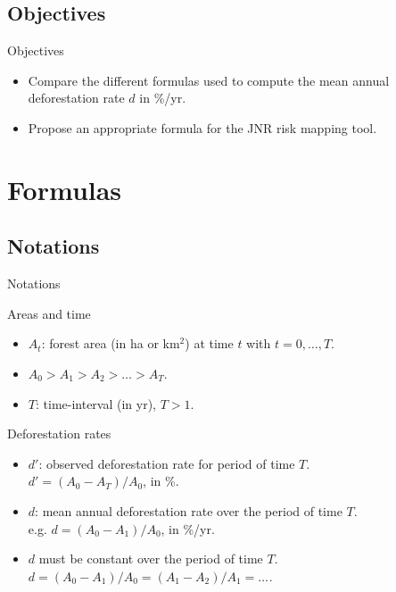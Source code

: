 \documentclass[10pt,table,dvipsnames,compress]{beamer}
\begin{document}
\subsection{Objectives}
\label{sec:orgccff547}

\begin{frame}[label={sec:orgce403f6}]{Objectives}
\begin{itemize}
\item Compare the different formulas used to compute the \alert{\alert{mean annual deforestation rate}} \(d\) in \%/yr.
\item Propose an appropriate formula for the JNR risk mapping tool.
\end{itemize}
\end{frame}

\section{Formulas}
\label{sec:org18477ee}

\subsection{Notations}
\label{sec:org9d871dd}

\begin{frame}[label={sec:org7f3b821}]{Notations}
\begin{block}{Areas and time}
\begin{itemize}
\item \(A_t\): forest area (in ha or km\(^2\)) at time \(t\) with \(t=0,\ldots,T\).
\item \(A_0 > A_1 > A_2 > \ldots > A_T\).
\item \(T\): time-interval (in yr), \(T > 1\).
\end{itemize}
\end{block}

\begin{block}{Deforestation \alert{\alert{rates}}}
\begin{itemize}
\item \(d'\): observed deforestation rate for period of time \(T\). \\
\(d' = (A_0-A_T)/A_0\), in \%.
\item \(d\): \alert{\alert{mean annual deforestation rate}} over the period of time \(T\). \\
e.g. \(d=(A_0-A_1)/A_0\), in \%/yr.
\item \(d\) must be constant over the period of time \(T\). \\
\(d=(A_0-A_1)/A_0=(A_1-A_2)/A_1=\ldots_{}\).
\end{itemize}
\end{block}
\end{frame}
\end{document}
